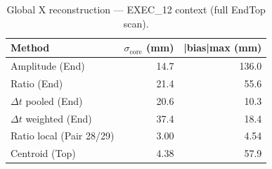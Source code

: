 \begin{table}[htbp]
\centering
\small
\caption{Global X reconstruction — EXEC\_12 context (full EndTop scan).}
\label{tab:global_context}
\begin{tabular}{lrr}
\toprule
\textbf{Method} & \textbf{$\sigma_{\mathrm{core}}$ (mm)} & \textbf{|bias|max (mm)} \\
\midrule
Amplitude (End) & 14.7 & 136.0 \\
Ratio (End) & 21.4 & 55.6 \\
$\Delta t$ pooled (End) & 20.6 & 10.3 \\
$\Delta t$ weighted (End) & 37.4 & 18.4 \\
Ratio local (Pair 28/29) & 3.00 & 4.54 \\
Centroid (Top) & 4.38 & 57.9 \\
\bottomrule
\end{tabular}
\end{table}
